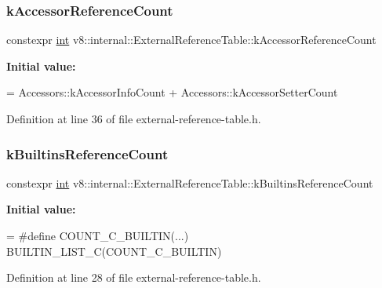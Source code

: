 \subsubsection{\texorpdfstring{k\+Accessor\+Reference\+Count}{kAccessorReferenceCount}}
{\footnotesize\ttfamily constexpr \mbox{\hyperlink{classint}{int}} v8\+::internal\+::\+External\+Reference\+Table\+::k\+Accessor\+Reference\+Count\hspace{0.3cm}{\ttfamily [static]}}

{\bfseries Initial value\+:}
\begin{DoxyCode}
=
      Accessors::kAccessorInfoCount + Accessors::kAccessorSetterCount
\end{DoxyCode}


Definition at line 36 of file external-\/reference-\/table.\+h.

\mbox{\label{classv8_1_1internal_1_1ExternalReferenceTable_afaa254cba2565a19fc48a4648474e8a9}} 
\subsubsection{\texorpdfstring{k\+Builtins\+Reference\+Count}{kBuiltinsReferenceCount}}
{\footnotesize\ttfamily constexpr \mbox{\hyperlink{classint}{int}} v8\+::internal\+::\+External\+Reference\+Table\+::k\+Builtins\+Reference\+Count\hspace{0.3cm}{\ttfamily [static]}}

{\bfseries Initial value\+:}
\begin{DoxyCode}
=
\textcolor{preprocessor}{#define COUNT\_C\_BUILTIN(...) }
\textcolor{preprocessor}{      BUILTIN\_LIST\_C(COUNT\_C\_BUILTIN)}
\end{DoxyCode}


Definition at line 28 of file external-\/reference-\/table.\+h.

\mbox{\label{classv8_1_1internal_1_1ExternalReferenceTable_ac865cba7405fd7c475ee7e9826ba4365}} 
